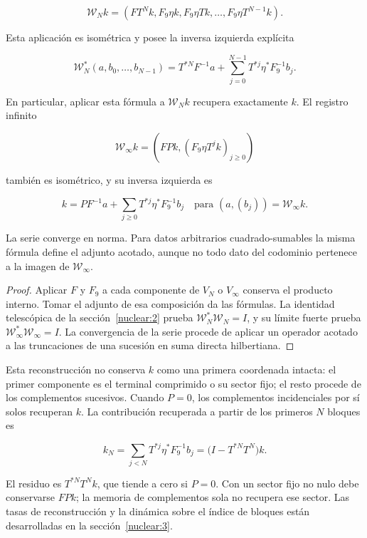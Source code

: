 \[
\mathcal W_Nk=\left(FT^Nk,F_9\eta k,F_9\eta Tk,\ldots,F_9\eta T^{N-1}k\right).
\]

\begin{theorem}
Esta aplicación es isométrica y posee la inversa izquierda explícita

\[
\mathcal W_N^*(a,b_0,\ldots,b_{N-1})
=T^{*N}F^{-1}a+
\sum_{j=0}^{N-1}T^{*j}\eta^*F_9^{-1}b_j.
\]

En particular, aplicar esta fórmula a \(\mathcal W_Nk\) recupera exactamente \(k\). El registro infinito

\[
\mathcal W_\infty k=\left(FPk,(F_9\eta T^jk)_{j\ge0}\right)
\]

también es isométrico, y su inversa izquierda es

\[
k=PF^{-1}a+\sum_{j\ge0}T^{*j}\eta^*F_9^{-1}b_j
\quad\text{para }(a,(b_j))=\mathcal W_\infty k.
\]

La serie converge en norma. Para datos arbitrarios cuadrado-sumables la misma fórmula define el adjunto acotado, aunque no todo dato del codominio pertenece a la imagen de \(\mathcal W_\infty\).
\end{theorem}

\begin{proof}
Aplicar \(F\) y \(F_9\) a cada componente de \(V_N\) o \(V_\infty\) conserva el producto interno. Tomar el adjunto de esa composición da las fórmulas. La identidad telescópica de la sección~\ref{nuclear:2} prueba \(\mathcal W_N^*\mathcal W_N=I\), y su límite fuerte prueba \(\mathcal W_\infty^*\mathcal W_\infty=I\). La convergencia de la serie procede de aplicar un operador acotado a las truncaciones de una sucesión en suma directa hilbertiana.
\end{proof}

Esta reconstrucción no conserva \(k\) como una primera coordenada intacta: el primer componente es el terminal comprimido o su sector fijo; el resto procede de los complementos sucesivos. Cuando \(P=0\), los complementos incidenciales por sí solos recuperan \(k\). La contribución recuperada a partir de los primeros \(N\) bloques es

\[
k_N=\sum_{j<N}T^{*j}\eta^*F_9^{-1}b_j
=\bigl(I-T^{*N}T^N\bigr)k.
\]

El residuo es \(T^{*N}T^Nk\), que tiende a cero si \(P=0\). Con un sector fijo no nulo debe conservarse \(FPk\); la memoria de complementos sola no recupera ese sector. Las tasas de reconstrucción y la dinámica sobre el índice de bloques están desarrolladas en la sección~\ref{nuclear:3}.

